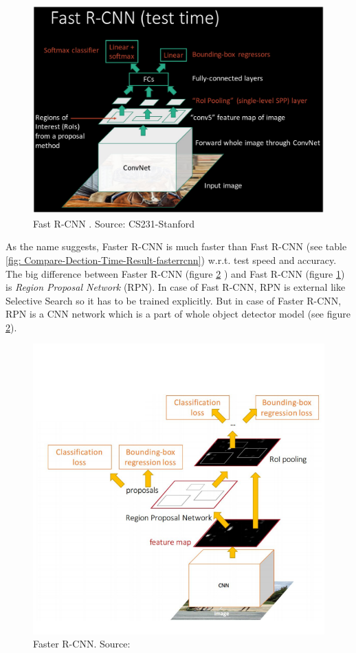 \documentclass{report}
\begin{document}
\begin{figure}[H]
\includegraphics[width=0.85\linewidth]{Fast-RCNN.png}
\centering
\captionsetup{justification=centering}
\caption{Fast R-CNN \cite{girshick2015fast} . Source: CS231-Stanford\protect\footnotemark}
\label{fig: Fast R-CNN}
\end{figure}

As the name suggests, Faster R-CNN is much faster than Fast R-CNN (see table \ref{fig: Compare-Dection-Time-Result-fasterrcnn}) w.r.t. test speed and accuracy. The big difference between Faster R-CNN (figure \ref{fig: Faster R-CNN} ) and Fast R-CNN (figure \ref{fig: Fast R-CNN})  is \textit{Region Proposal Network} (RPN). In case of  Fast R-CNN, RPN is external like Selective Search so it has to be trained explicitly. But in case of Faster R-CNN, RPN is a CNN network which is a part of whole object detector model (see figure \ref{fig: Faster R-CNN}).   

\begin{figure}[H]
\includegraphics[width=0.85\linewidth]{Faster-RCNN.png}
\centering
\captionsetup{justification=centering}
\caption{Faster R-CNN. Source: \cite{ren2015faster}}
\label{fig: Faster R-CNN}
\end{figure}
\end{document}
